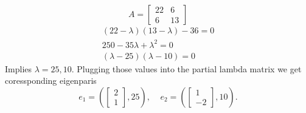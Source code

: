 \documentclass[letter]{article}
\newenvironment{menumerate}{\edef\backupindent{\the\parindent}
  \enumerate\setlength{\parindent}{\backupindent}}
  {\endenumerate}
\begin{document}
\begin{menumerate}
\begin{menumerate}
        \item
        \begin{equation*}
        A =
            \begin{bmatrix}
                22&6\\
                6&13
            \end{bmatrix}
        \end{equation*}
        \begin{equation*}
                 \begin{aligned}
                     (22 - \lambda)(13 - \lambda) - 36 = 0 \\
                     250 - 35\lambda + \lambda^2 = 0 \\
                     (\lambda - 25)(\lambda - 10) = 0
                 \end{aligned}
        \end{equation*}
        Implies $\lambda = 25, 10$. Plugging those values into the partial lambda matrix we get coressponding eigenparis
        \begin{equation*}
                 e_1 = \left(\begin{bmatrix}
                     2 \\ 1
                 \end{bmatrix}, 25\right),
                 \;\;\;\;
                 e_2 = \left(\begin{bmatrix}
                     1 \\ -2
                 \end{bmatrix}
                 , 10\right).
        \end{equation*}


\end{menumerate}
\end{menumerate}
\end{document}
